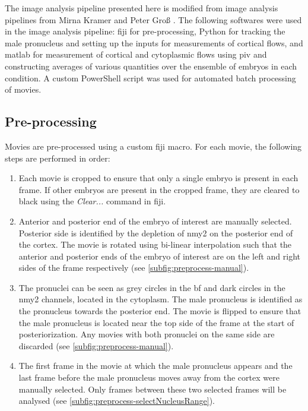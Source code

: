 The image analysis pipeline presented here is modified from image analysis pipelines from Mirna Kramer \citep{mirna2015linking} and Peter Gro{\ss} \citep{gross2019guiding}. The following softwares were used in the image analysis pipeline: \ac{fiji} \citep{schindelin2012fiji,linkert2010metadata} for pre-processing, Python \citep{python38} for tracking the male pronucleus and setting up the inputs for measurements of cortical flows, and \ac{matlab} \citep{MATLAB:2016a} for measurement of cortical and cytoplasmic flows using \acs{piv} and constructing averages of various quantities over the ensemble of embryos in each condition. A custom PowerShell script was used for automated batch processing of movies.

\subsection{Pre-processing}\label{subsec:preprocess}
Movies are pre-processed using a custom \ac{fiji} macro. For each movie, the following steps are performed in order:
\begin{enumerate}
    \item Each movie is cropped to ensure that only a single embryo is present in each frame. If other embryos are present in the cropped frame, they are cleared to black using the \emph{Clear...} command in \ac{fiji}.
    \item Anterior and posterior end of the embryo of interest are manually selected. Posterior side is identified by the depletion of \ac{nmy2} on the posterior end of the cortex. The movie is rotated using bi-linear interpolation such that the anterior and posterior ends of the embryo of interest are on the left and right sides of the frame respectively (see \autoref{subfig:preprocess-manual}).
    \item The pronuclei can be seen as grey circles in the \ac{bf} and dark circles in the \ac{nmy2} channels, located in the cytoplasm. The male pronucleus is identified as the pronucleus towards the posterior end. The movie is flipped to ensure that the male pronucleus is located near the top side of the frame at the start of posteriorization. Any movies with both pronuclei on the same side are discarded  (see \autoref{subfig:preprocess-manual}).
    \item The first frame in the movie at which the male pronucleus appears and the last frame before the male pronucleus moves away from the cortex were manually selected. Only frames between these two selected frames will be analysed  (see \autoref{subfig:preprocess-selectNucleusRange}).
\end{enumerate}

